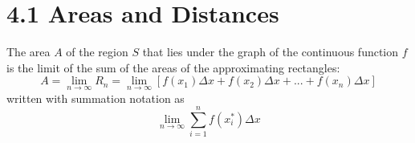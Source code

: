 %
%

\section*{4.1 Areas and Distances}

The area \(A\) of the region \(S\) that lies under the graph of the continuous function \(f\) is the limit of the sum of the areas of the approximating rectangles:
$$ A = \lim_{n \to \infty}R_n = \lim_{n \to \infty}[f(x_1) \Delta x + f(x_2) \Delta x + ... + f(x_n) \Delta x] $$
written with summation notation as 
$$ \lim_{n \to \infty}\sum_{i=1}^{n}f(x_i^*) \Delta x $$

